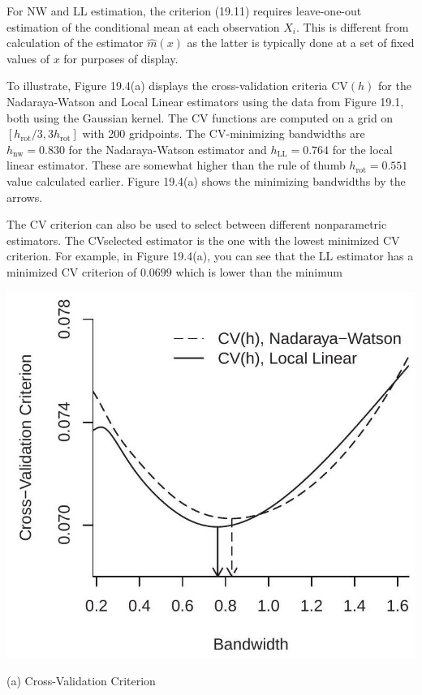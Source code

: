 \documentclass[10pt]{article}
\begin{document}
For NW and LL estimation, the criterion (19.11) requires leave-one-out estimation of the conditional mean at each observation $X_{i}$. This is different from calculation of the estimator $\widehat{m}(x)$ as the latter is typically done at a set of fixed values of $x$ for purposes of display.

To illustrate, Figure 19.4(a) displays the cross-validation criteria $\mathrm{CV}(h)$ for the Nadaraya-Watson and Local Linear estimators using the data from Figure 19.1, both using the Gaussian kernel. The CV functions are computed on a grid on $\left[h_{\mathrm{rot}} / 3,3 h_{\mathrm{rot}}\right]$ with 200 gridpoints. The CV-minimizing bandwidths are $h_{\mathrm{nw}}=0.830$ for the Nadaraya-Watson estimator and $h_{\mathrm{LL}}=0.764$ for the local linear estimator. These are somewhat higher than the rule of thumb $h_{\mathrm{rot}}=0.551$ value calculated earlier. Figure 19.4(a) shows the minimizing bandwidths by the arrows.

The CV criterion can also be used to select between different nonparametric estimators. The CVselected estimator is the one with the lowest minimized CV criterion. For example, in Figure 19.4(a), you can see that the LL estimator has a minimized CV criterion of $0.0699$ which is lower than the minimum

\includegraphics[max width=\textwidth]{2022_10_23_027876b875523fa3ea56g-17}

(a) Cross-Validation Criterion
\end{document}
